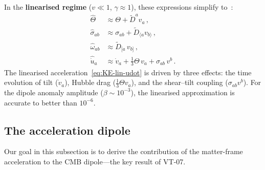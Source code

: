 In the \textbf{linearised regime} ($v \ll 1$, $\gamma \approx 1$),
these expressions simplify
to~\cite{EllisVanElst1999,EllisMaartens2012}:
\begin{align}
\hat{\Theta} &\approx \Theta + \tilde{D}^a v_a\,,
\label{eq:KE-lin-Theta}\\
\hat{\sigma}_{ab} &\approx \sigma_{ab}
  + \tilde{D}_{\langle a} v_{b\rangle}\,,
\label{eq:KE-lin-sigma}\\
\hat{\omega}_{ab} &\approx \tilde{D}_{[a}\,v_{b]}\,,
\label{eq:KE-lin-omega}\\
\hat{\dot{u}}_a &\approx \dot{v}_a
  + \tfrac{1}{3}\Theta\,v_a
  + \sigma_{ab}\,v^b\,.
\label{eq:KE-lin-udot}
\end{align}
The linearised acceleration~\eqref{eq:KE-lin-udot} is driven
by three effects: the time evolution of tilt ($\dot{v}_a$),
Hubble drag ($\frac{1}{3}\Theta v_a$), and the shear--tilt
coupling ($\sigma_{ab}v^b$).  For the dipole anomaly amplitude
($\beta \sim 10^{-3}$), the linearised approximation is
accurate to better than $10^{-6}$.


\subsection{The acceleration dipole}\label{sec:accel-dipole}

Our goal in this subsection is to derive the contribution of
the matter-frame acceleration to the CMB dipole---the key
result of VT-07.


